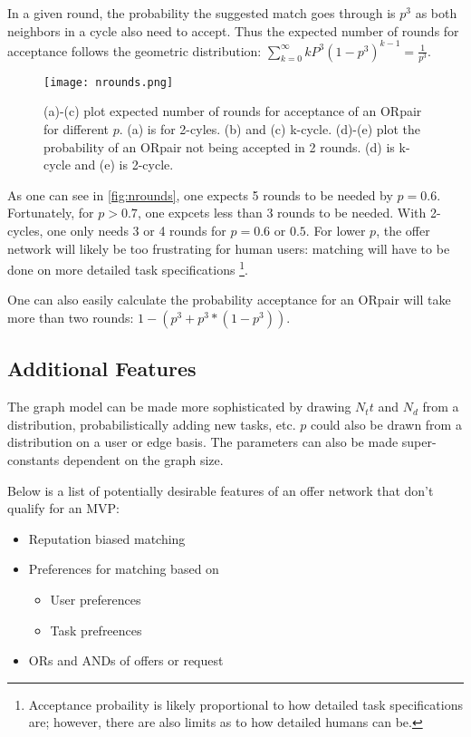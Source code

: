 \documentclass[main.tex]{subfiles}
\begin{document}
In a given round, the probability the suggested match goes through is $p^3$ as both neighbors in a cycle also need to accept. Thus the expected number of rounds for acceptance follows the geometric distribution: $\sum_{k=0}^{\infty} k P^3 (1 - p^3)^{k-1} = \frac{1}{p^3}$.

\begin{figure}
  \texttt{[image: nrounds.png]}
  \caption{(a)-(c) plot expected number of rounds for acceptance of an ORpair for different $p$. (a) is for 2-cyles. (b) and (c) k-cycle. (d)-(e) plot the probability of an ORpair not being accepted in 2 rounds. (d) is k-cycle and (e) is 2-cycle.}
  \label{nrounds}
\end{figure}

As one can see in \ref{fig:nrounds}, one expects 5 rounds to be needed by $p = 0.6$. Fortunately, for $p > 0.7$, one expcets less than 3 rounds to be needed. With 2-cycles, one only needs 3 or 4 rounds for $p = 0.6$ or $0.5$. For lower $p$, the offer network will likely be too frustrating for human users: matching will have to be done on more detailed task specifications \footnote{Acceptance probaility is likely proportional to how detailed task specifications are; however, there are also limits as to how detailed humans can be.}.

One can also easily calculate the probability acceptance for an ORpair will take more than two rounds: $1 - (p^3 + p^3 * (1 - p^3))$.

\subsection{Additional Features}

The graph model can be made more sophisticated by drawing $N_tt$ and $N_d$ from a distribution, probabilistically adding new tasks, etc. $p$ could also be drawn from a distribution on a user or edge basis. The parameters can also be made super-constants dependent on the graph size.

Below is a list of potentially desirable features of an offer network that don't qualify for an MVP:
\begin{itemize}
  \item Reputation biased matching
  \item Preferences for matching based on
    \begin{itemize}
      \item User preferences
      \item Task prefreences
    \end{itemize}
  \item ORs and ANDs of offers or request
\end{itemize}
\end{document}
